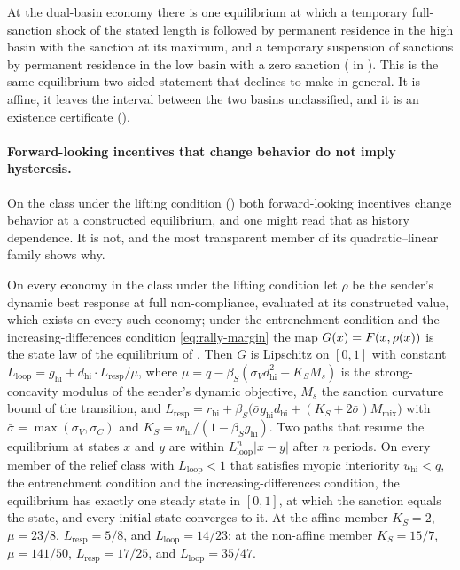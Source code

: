 At the dual-basin economy there is one equilibrium at which a temporary
full-sanction shock of the stated length is followed by permanent residence
in the high basin with the sanction at its maximum, and a temporary suspension
of sanctions by permanent residence in the low basin with a zero
sanction ( in ).
This is the same-equilibrium two-sided statement that 
declines to make in general. It is affine, it leaves the interval between the
two basins unclassified, and it is an existence certificate
().


\paragraph{Forward-looking incentives that change behavior do not imply hysteresis.}
\label{sec:compstat:activation-not-hysteresis}
On the class under the lifting condition () both forward-looking incentives
change behavior at a constructed equilibrium, and one might read that as history
dependence. It is not, and the most transparent member of its quadratic--linear
family shows why.

\begin{proposition}
\label{prop:activation-not-hysteresis}
On every economy in the class under the lifting condition let $\rho$ be the
sender's dynamic best response at full non-compliance, evaluated at its constructed value, which
exists on every such economy; under the entrenchment condition and the increasing-differences condition
\eqref{eq:rally-margin} the map $G(x)=F(x,\rho(x))$ is the state law of the
equilibrium of
. Then $G$ is Lipschitz on $[0,1]$ with constant
$L_{\mathrm{loop}}=g_{\mathrm{hi}}+d_{\mathrm{hi}}\cdot L_{\mathrm{resp}}/\mu$,
where $\mu=q-\beta_S(\sigma_V d_{\mathrm{hi}}^2+K_S M_s)$ is the
strong-concavity modulus of the sender's dynamic objective, $M_s$ the
sanction curvature bound of the transition, and
$L_{\mathrm{resp}}=r_{\mathrm{hi}}+\beta_S\bigl(\bar\sigma g_{\mathrm{hi}}d_{\mathrm{hi}}
+(K_S+2\bar\sigma)M_{\mathrm{mix}}\bigr)$ with
$\bar\sigma=\max(\sigma_V,\sigma_C)$ and $K_S=w_{\mathrm{hi}}/(1-\beta_Sg_{\mathrm{hi}})$. Two paths that resume the equilibrium
at states $x$ and $y$ are within $L_{\mathrm{loop}}^n|x-y|$ after $n$
periods. On every member of the relief class with $L_{\mathrm{loop}}<1$ that
satisfies myopic interiority $u_{\mathrm{hi}}<q$, the entrenchment condition and
the increasing-differences condition, the equilibrium has exactly one steady state in $[0,1]$, at
which the sanction equals the state, and every initial state converges to
it. At the affine member $K_S=2$,
$\mu=23/8$, $L_{\mathrm{resp}}=5/8$, and $L_{\mathrm{loop}}=14/23$; at the
non-affine member $K_S=15/7$, $\mu=141/50$, $L_{\mathrm{resp}}=17/25$, and
$L_{\mathrm{loop}}=35/47$.
\end{proposition}


